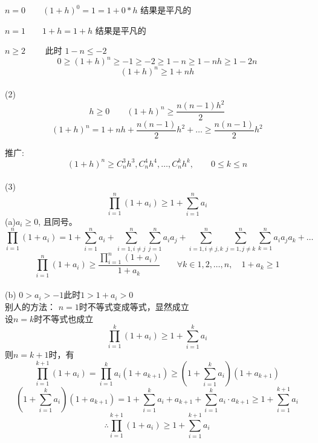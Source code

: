 \documentclass[10pt,a4paper]{book}
\begin{document}
	$ n=0 \qquad (1+h)^0 = 1 = 1+0*h $  结果是平凡的
	
	$ n=1 \qquad 1+h = 1+h $ 结果是平凡的
	
	$ n \geq 2 \qquad $ 此时 $ 1-n \leq -2 $
	\[ 0 \geq (1+h)^n \geq -1 \geq -2 \geq 1-n \geq 1-nh \geq 1- 2n  \]
	\[ (1+h)^n \geq 1+nh \]
	\\
	(2) 
	\[ h\geq 0 \qquad (1+h)^n \geq \frac{n(n-1)h^2}{2} \]
	\[ (1+h)^n=1+nh+\frac{n(n-1)}{2}h^2 + \dots \geq \frac{n(n-1)}{2}h^2  \]
	
	推广:
	\[ (1+h)^n \geq C_n^3 h^3, C_n^4 h^4, \dots , C_n^k h^k ,\qquad 0\leq k\leq n\]
	\\
	(3) 
	\[ \prod_{i=1}^n (1+a_i)\ge 1+\sum_{i=1}^n a_i \]
	(a)$ a_i \ge 0$, 且同号。 
	\[ \prod_{i=1}^n (1+a_i) = 1+ \sum_{i=1}^n a_i + \sum_{i=1,i\neq j}^n \sum_{j=1}^n a_i a_j + \sum_{i=1,i\neq j,k}^n \sum_{j=1,j\neq k}^n \sum_{k=1}^n a_i a_j a_k+\dots \]
	\[ \prod_{i=1}^n (1+a_i) \geq \frac{\prod_{i=1}^n(1+a_i)}{1+a_k} \qquad \forall k\in 1,2,\dots , n,\quad 1+a_k \geq 1 \]
	\\
	(b) $ 0 > a_i > -1 \text{此时} 1 > 1+a_i > 0$
	\\别人的方法：
	$ n=1 $时不等式变成等式，显然成立\\
	设$ n=k $时不等式也成立
	\[ \prod_{i=1}^k(1+a_i)\ge 1+\sum_{i=1}^k a_i\]
	则$ n=k+1 $时，有
	\[ \prod_{i=1}^{k+1}(1+a_i) = \prod_{i=1}^k a_i (1 + a_{k+1}) \ge (1+\sum_{i=1}^k a_i) (1+a_{k+1})\]
	\[(1+\sum_{i=1}^k a_i) (1+a_{k+1})=1+\sum_{i=1}^k a_i + a_{k+1} + \sum_{i=1}^k a_i\cdot a_{k+1} \ge 1+\sum_{i=1}^{k+1} a_i \]
	\[\therefore \prod_{i=1}^{k+1}(1+a_i)\ge 1+\sum_{i=1}^{k+1} a_i\]
	
\end{document}
